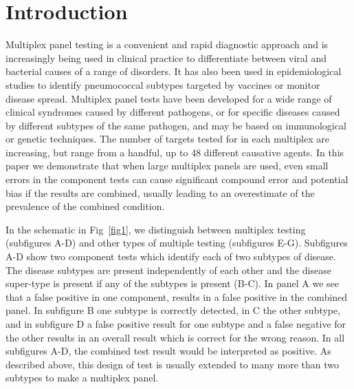 \documentclass[10pt,letterpaper]{article}
\begin{document}
\linenumbers

\section*{Introduction}

Multiplex panel testing is a convenient and rapid diagnostic approach and is increasingly being used in clinical practice to differentiate between viral and bacterial causes of a range of disorders\cite{ramanan2017}. It has also been used in epidemiological studies to identify pneumococcal subtypes targeted by vaccines\cite{bonten2015} or monitor disease spread\cite{henson2023}. Multiplex panel tests have been developed for a wide range of clinical syndromes caused by different pathogens, or for specific diseases caused by different subtypes of the same pathogen\cite{ramanan2017}, and may be based on immunological\cite{pride2012,kalina2020} or genetic techniques\cite{mengelle2013,murphy2020,jaaskelainen2006,jansen2011,grondahl1999,hendolin1997}. The number of targets tested for in each multiplex are increasing, but range from a handful, up to 48 different causative agents\cite{henson2023}. In this paper we demonstrate that when large multiplex panels are used, even small errors in the component tests can cause significant compound error and potential bias if the results are combined, usually leading to an overestimate of the prevalence of the combined condition.

In the schematic in Fig~\ref{fig1}, we distinguish between multiplex testing (subfigures A-D) and other types of multiple testing (subfigures E-G). Subfigures A-D show two component tests which identify each of two subtypes of disease. The disease subtypes are present independently of each other and the disease super-type is present if any of the subtypes is present (B-C). In panel A we see that a false positive in one component, results in a false positive in the combined panel. In subfigure B one subtype is correctly detected, in C the other subtype, and in subfigure D a false positive result for one subtype and a false negative for the other results in an overall result which is correct for the wrong reason. In all subfigures A-D, the combined test result would be interpreted as positive. As described above, this design of test is usually extended to many more than two subtypes to make a multiplex panel.
\end{document}
